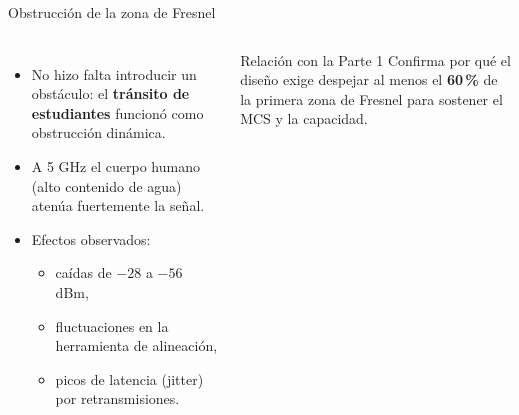 \begin{frame}{Obstrucción de la zona de Fresnel}
  \begin{columns}[c]
    \begin{itemize}
      \item No hizo falta introducir un obstáculo: el \textbf{tránsito de estudiantes}
            funcionó como obstrucción dinámica.
      \item A 5 GHz el cuerpo humano (alto contenido de agua) atenúa fuertemente la señal.
      \item Efectos observados:
      \begin{itemize}
        \item caídas de $-28$ a $-56$ dBm,
        \item fluctuaciones en la herramienta de alineación,
        \item picos de latencia (jitter) por retransmisiones.
      \end{itemize}
    \end{itemize}
    \begin{alertblock}{Relación con la Parte 1}
      Confirma por qué el diseño exige despejar al menos el \textbf{60\,\%} de la primera
      zona de Fresnel para sostener el MCS y la capacidad.
    \end{alertblock}
  \end{columns}
\end{frame}
